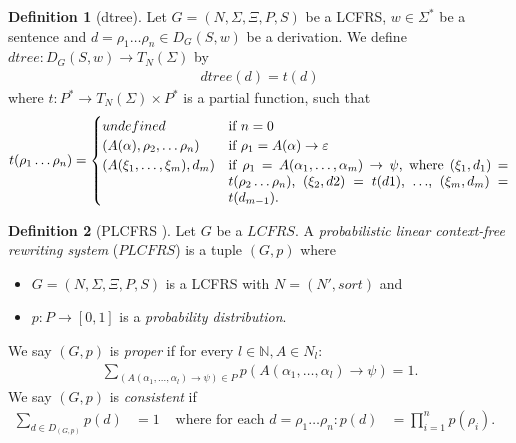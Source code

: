 \documentclass{tudscrartcl}
\theoremstyle{definition}
\newtheorem{definition}{Definition}[section]
\begin{document}
\begin{definition}[dtree]
	Let $G = (N, \Sigma, \Xi, P, S)$ be a LCFRS, $w \in \Sigma^*$ be a sentence and
	$d = \rho_1 \ldots \rho_n \in D_G(S, w)$ be a derivation.
	We define $dtree: D_G(S, w) \to T_N(\Sigma)$ by
	\begin{align*}
		dtree(d) = t(d)
	\end{align*}
	where $t: P^* \to T_N(\Sigma) \times P^*$ is a partial function, such that
	\begin{align*}
		t(\rho_1 \ldots \rho_n) =
		\begin{cases}
			undefined & \text{if } n = 0\\
			(A(\alpha), \rho_2, \ldots \rho_n)
			& \text{if } \rho_1 = A(\alpha) \to \varepsilon\\
			(A(\xi_1, \ldots, \xi_m), d_m)
			& \parbox[t]{0.6\textwidth}{if
			$\rho_1 = A(\alpha_1, \ldots, \alpha_m) \to \psi$, where 
			$(\xi_1, d_1) = t(\rho_2 \ldots \rho_n)$,
			$(\xi_2, d2) = t(d1)$, $\ldots$, $(\xi_m, d_m) = t(d_{m-1}).$}
		\end{cases}
	\end{align*}
\end{definition}

\begin{definition}[PLCFRS \cite{kato06}]
	Let $G$ be a $LCFRS$. A \emph{probabilistic linear context-free rewriting system}
	($PLCFRS$) is a tuple $(G, p)$ where
	\begin{itemize}
		\item $G = (N, \Sigma, \Xi, P, S)$ is a LCFRS with $N = (N', sort)$ and
		\item $p: P \to [0, 1]$ is a \emph{probability distribution}.
	\end{itemize}
	We say $(G, p)$ is \emph{proper} if for every $l \in \mathbb{N}, A \in N_l:$
	\begin{align*}
		\sum_{(A(\alpha_1, \ldots, \alpha_l) \to \psi) \in P}
			p(A(\alpha_1, \ldots, \alpha_l) \to \psi) = 1.
	\end{align*}
	We say $(G, p)$ is \emph{consistent} if
	\begin{align*}
		\sum _{d \in D_{(G, p)}} p(d) &= 1 &
		\text{ where for each } d = \rho_1 \ldots \rho_n :&&
		p(d) &= \prod _{i=1}^{n} p(\rho_i).&
	\end{align*}
\end{definition}
\end{document}
